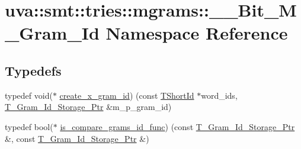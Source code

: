 \hypertarget{namespaceuva_1_1smt_1_1tries_1_1mgrams_1_1_____bit___m___gram___id}{}\section{uva\+:\+:smt\+:\+:tries\+:\+:mgrams\+:\+:\+\_\+\+\_\+\+Bit\+\_\+\+M\+\_\+\+Gram\+\_\+\+Id Namespace Reference}
\label{namespaceuva_1_1smt_1_1tries_1_1mgrams_1_1_____bit___m___gram___id}
\subsection*{Typedefs}
\begin{DoxyCompactItemize}
\item 
typedef void($\ast$ \hyperlink{namespaceuva_1_1smt_1_1tries_1_1mgrams_1_1_____bit___m___gram___id_a848e9f221e40bfc02b580b84bee83f42}{create\+\_\+x\+\_\+gram\+\_\+id}) (const \hyperlink{namespaceuva_1_1smt_1_1hashing_adcf22e1982ad09d3a63494c006267469}{T\+Short\+Id} $\ast$word\+\_\+ids, \hyperlink{namespaceuva_1_1smt_1_1tries_1_1mgrams_1_1_m___gram___id_a478e6468dbd5dab37599c566d77c845c}{T\+\_\+\+Gram\+\_\+\+Id\+\_\+\+Storage\+\_\+\+Ptr} \&m\+\_\+p\+\_\+gram\+\_\+id)
\item 
typedef bool($\ast$ \hyperlink{namespaceuva_1_1smt_1_1tries_1_1mgrams_1_1_____bit___m___gram___id_a105ea5e949d0fadfa8344e3618b522b3}{is\+\_\+compare\+\_\+grams\+\_\+id\+\_\+func}) (const \hyperlink{namespaceuva_1_1smt_1_1tries_1_1mgrams_1_1_m___gram___id_a478e6468dbd5dab37599c566d77c845c}{T\+\_\+\+Gram\+\_\+\+Id\+\_\+\+Storage\+\_\+\+Ptr} \&, const \hyperlink{namespaceuva_1_1smt_1_1tries_1_1mgrams_1_1_m___gram___id_a478e6468dbd5dab37599c566d77c845c}{T\+\_\+\+Gram\+\_\+\+Id\+\_\+\+Storage\+\_\+\+Ptr} \&)
\end{DoxyCompactItemize}
